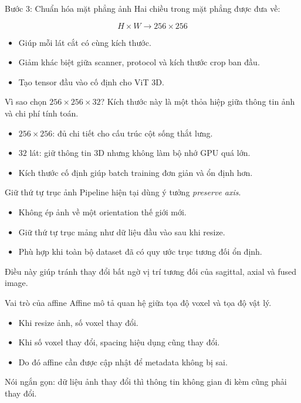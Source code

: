 \documentclass[aspectratio=169]{beamer}
\begin{document}
\begin{frame}{Bước 3: Chuẩn hóa mặt phẳng ảnh}
  Hai chiều trong mặt phẳng được đưa về:

  \[
    H \times W \rightarrow 256 \times 256
  \]

  \begin{itemize}
    \item Giúp mỗi lát cắt có cùng kích thước.
    \item Giảm khác biệt giữa scanner, protocol và kích thước crop ban đầu.
    \item Tạo tensor đầu vào cố định cho ViT 3D.
  \end{itemize}
\end{frame}

\begin{frame}{Vì sao chọn \(256 \times 256 \times 32\)?}
  Kích thước này là một thỏa hiệp giữa thông tin ảnh và chi phí tính toán.

  \begin{itemize}
    \item \(256 \times 256\): đủ chi tiết cho cấu trúc cột sống thắt lưng.
    \item \(32\) lát: giữ thông tin 3D nhưng không làm bộ nhớ GPU quá lớn.
    \item Kích thước cố định giúp batch training đơn giản và ổn định hơn.
  \end{itemize}
\end{frame}

\begin{frame}{Giữ thứ tự trục ảnh}
  Pipeline hiện tại dùng ý tưởng \textit{preserve axis}.

  \begin{itemize}
    \item Không ép ảnh về một orientation thế giới mới.
    \item Giữ thứ tự trục mảng như dữ liệu đầu vào sau khi resize.
    \item Phù hợp khi toàn bộ dataset đã có quy ước trục tương đối ổn định.
  \end{itemize}

  \vspace{0.3cm}
  Điều này giúp tránh thay đổi bất ngờ vị trí tương đối của sagittal, axial và fused image.
\end{frame}

\begin{frame}{Vai trò của affine}
  Affine mô tả quan hệ giữa tọa độ voxel và tọa độ vật lý.

  \begin{itemize}
    \item Khi resize ảnh, số voxel thay đổi.
    \item Khi số voxel thay đổi, spacing hiệu dụng cũng thay đổi.
    \item Do đó affine cần được cập nhật để metadata không bị sai.
  \end{itemize}

  \vspace{0.3cm}
  Nói ngắn gọn: dữ liệu ảnh thay đổi thì thông tin không gian đi kèm cũng phải thay đổi.
\end{frame}
\end{document}
